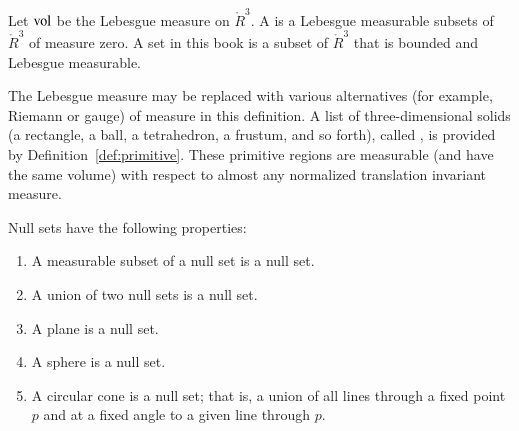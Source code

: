 
\begin{definition}
Let ${\operatorname{vol}}$ be the Lebesgue measure
on $\ring{R}^3$. 
A  is a 
Lebesgue measurable subsets of $\ring{R}^3$ of measure zero.
A  set in this book is a subset of $\ring{R}^3$ that
is bounded and Lebesgue measurable.
\end{definition}
%
%

\begin{remark}[]
  The Lebesgue measure may be replaced with various alternatives (for
  example, Riemann or gauge) of measure in this definition.  A list of
  three-dimensional solids (a rectangle, a ball, a tetrahedron, a
  frustum, and so forth), called , is
  provided by Definition~\ref{def:primitive}.  These primitive regions
  are measurable (and have the same volume) with respect to almost any
  normalized translation invariant measure.
\end{remark}

\begin{lemma}\label{lemma:null}
Null sets have the following  properties:
\begin{enumerate}%
\item A measurable subset of a null set is a null set.
\item A union of two null sets is a null set.
\item A plane is a null set.
\item A sphere is a null set.
\item A circular cone is a null set; that is, a union of all
lines through a fixed point $p$ and at
a fixed angle to a given line through $p$.
\label{enum:null}
%
%
%
%
\end{enumerate}
\end{lemma}
%

%



